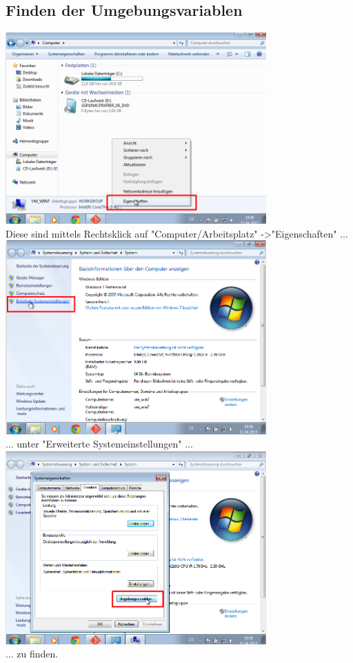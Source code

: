 \documentclass[ngerman,oneside, a4letter]{scrbook}
\begin{document}
\subsection{Finden der Umgebungsvariablen}
\includegraphics[width=100mm]{bilder/computer_properties}
\\
Diese sind mittels Rechtsklick auf "Computer/Arbeitsplatz" -\textgreater "Eigenschaften" ...
\\
\includegraphics[width=100mm]{bilder/advanced_properties}
\\
... unter "Erweiterte Systemeinstellungen" ...
\\
\includegraphics[width=100mm]{bilder/sys_vars}
\\
... zu finden.
\end{document}
